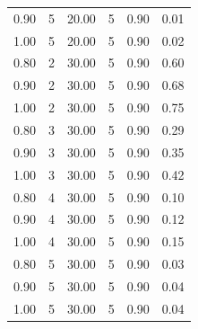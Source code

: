 \documentclass[12pt]{article}
\begin{document}
{{{{\begin{longtable}{cccccc}
  0.90 &   5 & 20.00 &   5 & 0.90 & 0.01 \\ 
  1.00 &   5 & 20.00 &   5 & 0.90 & 0.02 \\ 
  0.80 &   2 & 30.00 &   5 & 0.90 & 0.60 \\ 
  0.90 &   2 & 30.00 &   5 & 0.90 & 0.68 \\ 
  1.00 &   2 & 30.00 &   5 & 0.90 & 0.75 \\ 
  0.80 &   3 & 30.00 &   5 & 0.90 & 0.29 \\ 
  0.90 &   3 & 30.00 &   5 & 0.90 & 0.35 \\ 
  1.00 &   3 & 30.00 &   5 & 0.90 & 0.42 \\ 
  0.80 &   4 & 30.00 &   5 & 0.90 & 0.10 \\ 
  0.90 &   4 & 30.00 &   5 & 0.90 & 0.12 \\ 
  1.00 &   4 & 30.00 &   5 & 0.90 & 0.15 \\ 
  0.80 &   5 & 30.00 &   5 & 0.90 & 0.03 \\ 
  0.90 &   5 & 30.00 &   5 & 0.90 & 0.04 \\ 
  1.00 &   5 & 30.00 &   5 & 0.90 & 0.04 \\ 
   \hline
\end{longtable}



\theendnotes








}}}}
\end{document}
